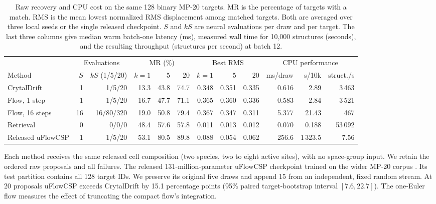 \begin{table}[htbp]
\centering\small\setlength{\tabcolsep}{3.8pt}
\caption{Raw recovery and CPU cost on the same 128 binary MP-20 targets. MR is the percentage of targets with a match. RMS is the mean lowest normalized RMS displacement among matched targets. Both are averaged over three local seeds or the single released checkpoint. $S$ and $kS$ are neural evaluations per draw and per target. The last three columns give median warm batch-one latency (ms), measured wall time for 10,000 structures (seconds), and the resulting throughput (structures per second) at batch 12.}
\label{tab:revision-binary}\smallskip
\begin{tabular}{@{}lrrrrrrrrrrr@{}}\hline
 & \multicolumn{2}{c}{Evaluations} & \multicolumn{3}{c}{MR (\%)} & \multicolumn{3}{c}{Best RMS} & \multicolumn{3}{c}{CPU performance}\\
Method & $S$ & $kS$ (1/5/20) & $k{=}1$ & $5$ & $20$ & $k{=}1$ & $5$ & $20$ & ms/draw & s/10k & struct./s\\\hline
CrytalDrift & 1 & 1/5/20 & 13.3 & 43.8 & 74.7 & 0.348 & 0.351 & 0.335 & 0.616 & 2.89 & 3\,463 \\
Flow, 1 step & 1 & 1/5/20 & 16.7 & 47.7 & 71.1 & 0.365 & 0.360 & 0.336 & 0.583 & 2.84 & 3\,521 \\
Flow, 16 steps & 16 & 16/80/320 & 19.0 & 50.8 & 79.4 & 0.367 & 0.347 & 0.311 & 5.377 & 21.43 & 467 \\
Retrieval & 0 & 0/0/0 & 48.4 & 57.6 & 57.8 & 0.011 & 0.013 & 0.012 & 0.070 & 0.188 & 53\,092 \\
Released uFlowCSP & 1 & 1/5/20 & 53.1 & 80.5 & 89.8 & 0.088 & 0.054 & 0.062 & 256.6 & 1\,323.5 & 7.56 \\
\hline\end{tabular}
\end{table}

Each method receives the same released cell composition (two species, two to eight active sites), with no space-group input. We retain the ordered raw proposals and all failures. The released 131-million-parameter uFlowCSP checkpoint trained on the wider MP-20 corpus \cite{uflow}. Its test partition contains all 128 target IDs. We preserve its original five draws and append 15 from an independent, fixed random stream. At 20 proposals uFlowCSP exceeds CrytalDrift by 15.1 percentage points (95\% paired target-bootstrap interval $[7.6,22.7]$). The one-Euler flow measures the effect of truncating the compact flow's integration.

